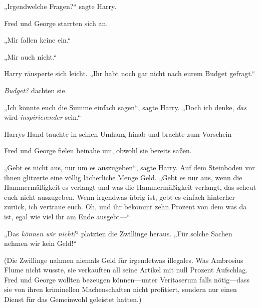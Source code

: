 „Irgendwelche Fragen?“ sagte Harry.

Fred und George starrten sich an.

„Mir fallen keine ein.“

„Mir auch nicht.“

Harry räusperte sich leicht. „Ihr habt noch gar nicht nach eurem Budget gefragt.“

\emph{Budget?} dachten sie.

„Ich könnte euch die Summe einfach sagen“, sagte Harry. „Doch ich denke, \emph{das} wird \emph{inspirierender} sein.“

Harrys Hand tauchte in seinen Umhang hinab und brachte zum Vorschein—

Fred und George fielen beinahe um, obwohl sie bereits saßen.

„Gebt es nicht aus, nur um es auszugeben“, sagte Harry. Auf dem Steinboden vor ihnen glitzerte eine völlig lächerliche Menge Geld. „Gebt es nur aus, wenn die Hammermäßigkeit es verlangt und was die Hammermäßigkeit verlangt, das scheut euch nicht auszugeben. Wenn irgendwas übrig ist, gebt es einfach hinterher zurück, ich vertraue euch. Oh, und ihr bekommt zehn Prozent von dem was da ist, egal wie viel ihr am Ende ausgebt—“

„Das \emph{können wir nicht!}“ platzten die Zwillinge heraus. „Für solche Sachen nehmen wir kein Geld!“

(Die Zwillinge nahmen niemals Geld für irgendetwas illegales. Was Ambrosius Flume nicht wusste, sie verkauften all seine Artikel mit null Prozent Aufschlag. Fred und George wollten bezeugen können—unter Veritaserum falls nötig—dass sie von ihren kriminellen Machenschaften nicht profitiert, sondern nur einen Dienst für das Gemeinwohl geleistet hatten.)

